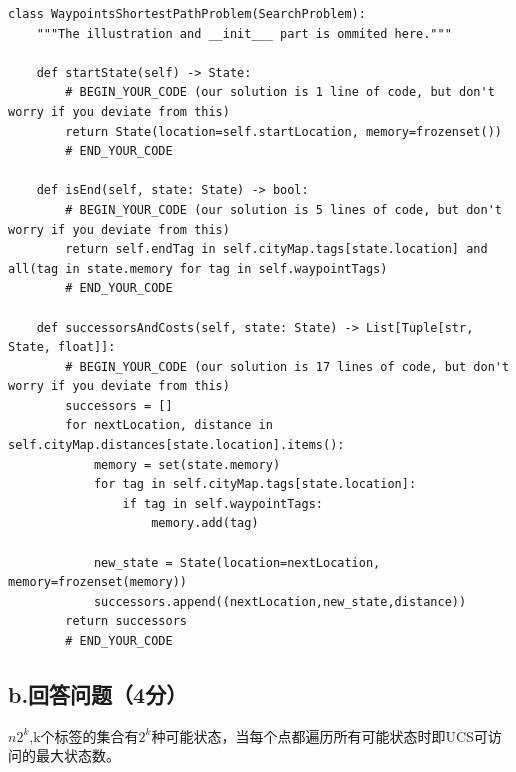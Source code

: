 \documentclass{article}
\begin{document}
 \begin{lstlisting}
class WaypointsShortestPathProblem(SearchProblem):
    """The illustration and __init___ part is ommited here."""

    def startState(self) -> State:
        # BEGIN_YOUR_CODE (our solution is 1 line of code, but don't worry if you deviate from this)
        return State(location=self.startLocation, memory=frozenset())
        # END_YOUR_CODE

    def isEnd(self, state: State) -> bool:
        # BEGIN_YOUR_CODE (our solution is 5 lines of code, but don't worry if you deviate from this)
        return self.endTag in self.cityMap.tags[state.location] and all(tag in state.memory for tag in self.waypointTags)
        # END_YOUR_CODE

    def successorsAndCosts(self, state: State) -> List[Tuple[str, State, float]]:
        # BEGIN_YOUR_CODE (our solution is 17 lines of code, but don't worry if you deviate from this)
        successors = []
        for nextLocation, distance in self.cityMap.distances[state.location].items():
            memory = set(state.memory)
            for tag in self.cityMap.tags[state.location]:
                if tag in self.waypointTags:
                    memory.add(tag)
        
            new_state = State(location=nextLocation, memory=frozenset(memory))
            successors.append((nextLocation,new_state,distance))
        return successors
        # END_YOUR_CODE
\end{lstlisting}

\subsection*{b.回答问题（4分）}
$n2^{k}$,k个标签的集合有$2^{k}$种可能状态，当每个点都遍历所有可能状态时即UCS可访问的最大状态数。
\end{document}
